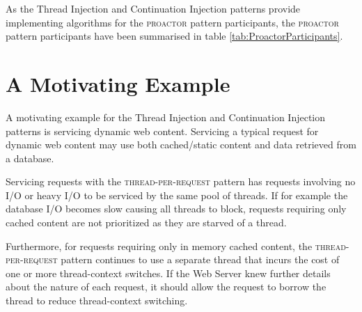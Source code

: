 \documentclass[prodmode]{style/acmlarge}
\begin{document}
As the Thread Injection and Continuation Injection patterns provide implementing
algorithms for the \textsc{proactor} pattern participants, the \textsc{proactor}
pattern participants have been summarised in table
\ref{tab:ProactorParticipants}.

\begin{table}[t]
\label{tab:ProactorParticipants}
\end{table}



\section{A Motivating Example}

A motivating example for the Thread Injection and Continuation Injection
patterns is servicing dynamic web content.  Servicing a typical request for
dynamic web content may use both cached/static content and data retrieved from a
database.

Servicing requests with the \textsc{thread-per-request} pattern has requests
involving no I/O or heavy I/O to be serviced by the same pool of threads.  If for
example the database I/O becomes slow causing all threads to block, requests
requiring only cached content are not prioritized as they are starved of a
thread.

Furthermore, for requests requiring only in memory cached content, the
\textsc{thread-per-request} pattern continues to use a separate thread that
incurs the cost of one or more thread-context switches.  If the Web Server knew
further details about the nature of each request, it should allow the request to
borrow the thread to reduce thread-context switching.
\end{document}

